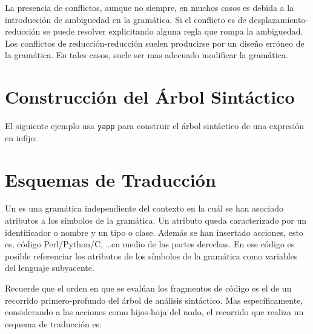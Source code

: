 La presencia de conflictos, aunque no siempre, en muchos casos es debida
a la introducción de ambiguedad en la gramática. Si el conflicto 
es de desplazamiento-reducción se puede resolver explicitando 
alguna regla que rompa la ambiguedad. Los conflictos de
reducción-reducción suelen producirse por un diseño erróneo
de la gramática. En tales casos, suele ser mas adecuado
modificar la gramática.


\section{Construcción del Árbol Sintáctico}
El siguiente ejemplo usa \verb|yapp| 
para construir el árbol sintáctico de una expresión en infijo:

\section{Esquemas de Traducción}
Un  es una gramática independiente del
contexto en la cuál se han asociado atributos a los símbolos de la gramática.
Un atributo queda caracterizado por un identificador
o nombre y un tipo o clase. Además se han insertado acciones, esto es,
código Perl/Python/C, \ldots en medio de las partes derechas.
En ese código es posible referenciar los atributos de los
símbolos de la gramática como variables del lenguaje subyacente.

Recuerde que el orden en que se evalúan los fragmentos de código
es el de un recorrido primero-profundo del árbol de análisis sintáctico.
Mas específicamente, considerando a las acciones como hijos-hoja del nodo,
el recorrido que realiza un esquema de traducción es:


